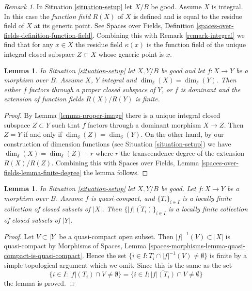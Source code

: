 \documentclass{stacks-project}
\theoremstyle{plain}
\newtheorem{lemma}[subsection]{Lemma}
\theoremstyle{definition}
\theoremstyle{remark}
\newtheorem{remark}[subsection]{Remark}
\numberwithin{equation}{subsection}
\begin{document}
\begin{remark}
\label{remark-function-field}
In Situation \ref{situation-setup} let $X/B$ be good. Assume $X$ is integral.
In this case the {\it function field} $R(X)$ of $X$ is defined and
is equal to the residue field of $X$ at its generic point.
See Spaces over Fields, Definition
\ref{spaces-over-fields-definition-function-field}.
Combining this with Remark \ref{remark-integral}
we find that for any $x \in X$ the residue field
$\kappa(x)$ is the function field of the
unique integral closed subspace $Z \subset X$
whose generic point is $x$.
\end{remark}

\begin{lemma}
\label{lemma-equal-dimension}
In Situation \ref{situation-setup} let $X, Y/B$ be good and let
$f : X \to Y$ be a morphism over $B$.
Assume $X$, $Y$ integral and $\dim_\delta(X) = \dim_\delta(Y)$.
Then either $f$ factors through a proper closed subspace
of $Y$, or $f$ is dominant and the extension of function fields
$R(X) / R(Y)$ is finite.
\end{lemma}

\begin{proof}
By Lemma \ref{lemma-proper-image} there is a unique integral closed
subspace $Z \subset Y$ such that $f$ factors through a dominant
morphism $X \to Z$. Then $Z = Y$ if and only if
$\dim_\delta(Z) = \dim_\delta(Y)$. On the other hand, by
our construction of dimension functions (see Situation \ref{situation-setup})
we have $\dim_\delta(X) = \dim_\delta(Z) + r$ where $r$ the
transcendence degree of the extension $R(X)/R(Z)$. Combining this with
Spaces over Fields, Lemma \ref{spaces-over-fields-lemma-finite-degree}
the lemma follows.
\end{proof}

\begin{lemma}
\label{lemma-quasi-compact-locally-finite}
In Situation \ref{situation-setup} let $X, Y/B$ be good.
Let $f : X \to Y$ be a morphism over $B$.
Assume $f$ is quasi-compact, and $\{T_i\}_{i \in I}$ is a locally
finite collection of closed subsets of $|X|$.
Then $\{\overline{|f|(T_i)}\}_{i \in I}$ is a locally finite
collection of closed subsets of $|Y|$.
\end{lemma}

\begin{proof}
Let $V \subset |Y|$ be a quasi-compact open subset.
Then $|f|^{-1}(V) \subset |X|$ is quasi-compact
by Morphisms of Spaces, Lemma
\ref{spaces-morphisms-lemma-quasi-compact-is-quasi-compact}.
Hence the set
$\{i \in I : T_i \cap |f|^{-1}(V) \not = \emptyset \}$
is finite by a simple topological argument which we omit.
Since this is the same as the set
$$
\{i \in I : |f|(T_i) \cap V \not = \emptyset \} =
\{i \in I : \overline{|f|(T_i)} \cap V \not = \emptyset \}
$$
the lemma is proved.
\end{proof}
\end{document}
